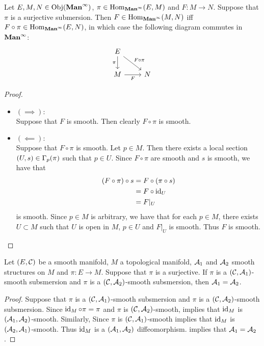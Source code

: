 \documentclass{book}
\begin{document}
	\begin{ex} 
		Let $E, M, N \in \operatorname{Obj}(\operatorname*{\text{\textbf{Man}}^{\infty}})$, $\pi \in \operatorname{Hom}_{\operatorname*{\text{\textbf{Man}}^{\infty}}}(E, M)$ and $F: M \rightarrow N$. Suppose that $\pi$ is a surjective submersion. Then $F \in \operatorname{Hom}_{\operatorname*{\text{\textbf{Man}}^{\infty}}}(M, N)$ iff $F \circ \pi \in \operatorname{Hom}_{\operatorname*{\text{\textbf{Man}}^{\infty}}}(E, N)$, in which case the following diagram commutes in $\operatorname*{\text{\textbf{Man}}^{\infty}}$:
		\[ 
		\begin{tikzcd}
			E \arrow[d, "\pi"'] \arrow[dr, "F \circ \pi"] &   \\
			M \arrow[r, "F"'] &  N
		\end{tikzcd}
		\]
	\end{ex}

	\begin{proof}\
		\begin{itemize}
			\item $(\implies):$ \\
			Suppose that $F$ is smooth. Then clearly $F \circ \pi$ is smooth.
			\item $(\impliedby):$ \\
			Suppose that $F \circ \pi$ is smooth. Let $p \in M$. Then there exists a local section $(U, s) \in \Gamma_p(\pi)$ such that $p \in U$. Since $F \circ \pi$ are smooth and $s$ is smooth, we have that 
			\begin{align*}
				(F \circ \pi) \circ s 
				& = F \circ (\pi \circ s) \\
				& = F \circ \operatorname{id}_U \\
				& = F|_U 
			\end{align*}
			is smooth. Since $p \in M$ is arbitrary, we have that for each $p \in M$, there exists $U \subset M$ such that $U$ is open in $M$, $p \in U$ and $F|_U$ is smooth. Thus $F$ is smooth.  
		\end{itemize}
	\end{proof}
	

	\begin{ex} 
		Let $(E, \mathcal{C})$ be a smooth manifold, $M$ a topological manifold, $\mathcal{A}_1$ and $\mathcal{A}_2$ smooth structures on $M$ and $\pi: E \rightarrow M$. Suppose that $\pi$ is a surjective. If $\pi$ is a $(\mathcal{C}, \mathcal{A}_1)$-smooth subsmersion and $\pi$ is a $(\mathcal{C}, \mathcal{A}_2)$-smooth subsmersion, then $\mathcal{A}_1 = \mathcal{A}_2$. 
	\end{ex}	

	\begin{proof}
		Suppose that $\pi$ is a $(\mathcal{C}, \mathcal{A}_1)$-smooth subsmersion and $\pi$ is a $(\mathcal{C}, \mathcal{A}_2)$-smooth subsmersion. Since $\operatorname{id}_M \circ \pi = \pi$ and $\pi$ is $(\mathcal{C}, \mathcal{A}_2)$-smooth,  implies that $\operatorname{id}_M$ is $(\mathcal{A}_1, \mathcal{A}_2)$-smooth. Similarly, Since $\pi$ is $(\mathcal{C}, \mathcal{A}_1)$-smooth  implies that $\operatorname{id}_M$ is $(\mathcal{A}_2, \mathcal{A}_1)$-smooth. Thus $\operatorname{id}_M$ is a $(\mathcal{A}_1, \mathcal{A}_2)$ diffeomorphism.  implies that $\mathcal{A}_1 = \mathcal{A}_2$. 
	\end{proof}
\end{document}
